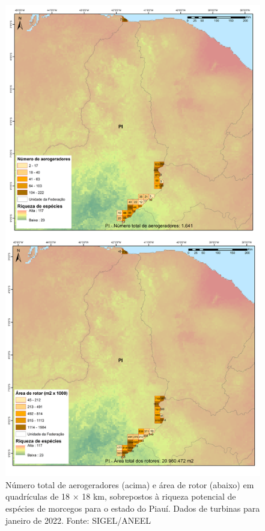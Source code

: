 \documentclass[
  oneside]{scrbook}
\begin{document}
\begin{figure}[H]

{\centering \includegraphics[width=0.7\linewidth]{imagens/cap09/Figura_9.6} 

}

\caption{Número total de aerogeradores (acima) e área de rotor (abaixo) em quadrículas de 18 × 18 km, sobrepostos à riqueza potencial de espécies de morcegos para o estado do Piauí. Dados de turbinas para janeiro de 2022. Fonte: SIGEL/ANEEL}\label{fig:71}
\end{figure}
\end{document}
